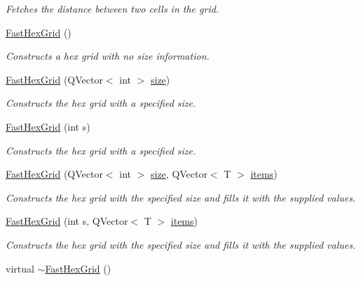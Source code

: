 \begin{DoxyCompactItemize}
\begin{DoxyCompactList}\small\item\em \-Fetches the distance between two cells in the grid. \end{DoxyCompactList}\item 
\hypertarget{classhsom_1_1_fast_hex_grid_a7d82cd1ac4c97eac37fd7bf0579d16a3}{\hyperlink{classhsom_1_1_fast_hex_grid_a7d82cd1ac4c97eac37fd7bf0579d16a3}{\-Fast\-Hex\-Grid} ()}\label{classhsom_1_1_fast_hex_grid_a7d82cd1ac4c97eac37fd7bf0579d16a3}

\begin{DoxyCompactList}\small\item\em \-Constructs a hex grid with no size information. \end{DoxyCompactList}\item 
\hyperlink{classhsom_1_1_fast_hex_grid_aec7541c31bf2b26837cdbf887d66fa5a}{\-Fast\-Hex\-Grid} (\-Q\-Vector$<$ int $>$ \hyperlink{classhsom_1_1_grid_a3e846473299eb2c7c259659eb61a6234}{size})
\begin{DoxyCompactList}\small\item\em \-Constructs the hex grid with a specified size. \end{DoxyCompactList}\item 
\hyperlink{classhsom_1_1_fast_hex_grid_a09b2f049297965971e33ea7d6e583da3}{\-Fast\-Hex\-Grid} (int s)
\begin{DoxyCompactList}\small\item\em \-Constructs the hex grid with a specified size. \end{DoxyCompactList}\item 
\hyperlink{classhsom_1_1_fast_hex_grid_a9dc41236780c5544948dfe3dd5cccf3e}{\-Fast\-Hex\-Grid} (\-Q\-Vector$<$ int $>$ \hyperlink{classhsom_1_1_grid_a3e846473299eb2c7c259659eb61a6234}{size}, \-Q\-Vector$<$ \-T $>$ \hyperlink{classhsom_1_1_grid_ae6b6ffb72e86c3904e8ac21253d85a24}{items})
\begin{DoxyCompactList}\small\item\em \-Constructs the hex grid with the specified size and fills it with the supplied values. \end{DoxyCompactList}\item 
\hyperlink{classhsom_1_1_fast_hex_grid_ad8e600cd2711e0882b3a97a3facbca8e}{\-Fast\-Hex\-Grid} (int s, \-Q\-Vector$<$ \-T $>$ \hyperlink{classhsom_1_1_grid_ae6b6ffb72e86c3904e8ac21253d85a24}{items})
\begin{DoxyCompactList}\small\item\em \-Constructs the hex grid with the specified size and fills it with the supplied values. \end{DoxyCompactList}\item 
\hypertarget{classhsom_1_1_fast_hex_grid_a9afacd0fd3f937ff69f14b196bef9cfa}{virtual \hyperlink{classhsom_1_1_fast_hex_grid_a9afacd0fd3f937ff69f14b196bef9cfa}{$\sim$\-Fast\-Hex\-Grid} ()}\label{classhsom_1_1_fast_hex_grid_a9afacd0fd3f937ff69f14b196bef9cfa}


\end{DoxyCompactItemize}
